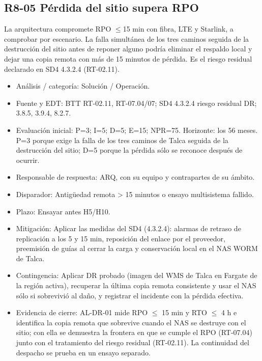 \subsection*{R8-05 \textemdash{} Pérdida del sitio supera RPO}

La arquitectura compromete RPO \ensuremath{\leq}15 min con fibra, LTE y Starlink, a comprobar por escenario. La falla simultánea de los tres caminos seguida de la destrucción del sitio antes de reponer alguno podría eliminar el respaldo local y dejar una copia remota con más de 15 minutos de pérdida. Es el riesgo residual declarado en SD4 4.3.2.4 (RT-02.11).

\begin{itemize}[leftmargin=*,itemsep=3pt]
\item Análisis / categoría: Solución / Operación.
\item Fuente y EDT: BTT RT-02.11, RT-07.04/07; SD4 4.3.2.4 riesgo residual DR; 3.8.5, 3.9.4, 8.2.7.
\item Evaluación inicial: P=3; I=5; D=5; E=15; NPR=75. Horizonte: los 56 meses. P=3 porque exige la falla de los tres caminos de Talca seguida de la destrucción del sitio; D=5 porque la pérdida sólo se reconoce después de ocurrir.
\item Responsable de respuesta: ARQ, con su equipo y contrapartes de su ámbito.
\item Disparador: Antigüedad remota > 15 minutos o ensayo multisistema fallido.
\item Plazo: Ensayar antes H5/H10.
\item Mitigación: Aplicar las medidas del SD4 (4.3.2.4): alarmas de retraso de replicación a los 5 y 15 min, reposición del enlace por el proveedor, preemisión de guías al cerrar la carga y conservación local en el NAS WORM de Talca.
\item Contingencia: Aplicar DR probado (imagen del WMS de Talca en Fargate de la región activa), recuperar la última copia remota consistente y usar el NAS sólo si sobrevivió al daño, y registrar el incidente con la pérdida efectiva.
\item Evidencia de cierre: AL-DR-01 mide RPO \ensuremath{\leq} 15 min y RTO \ensuremath{\leq} 4 h e identifica la copia remota que sobrevive cuando el NAS se destruye con el sitio; con ella se demuestra la frontera en que se cumple el RPO (RT-07.04) junto con el tratamiento del riesgo residual (RT-02.11). La continuidad del despacho se prueba en un ensayo separado.

\end{itemize}
